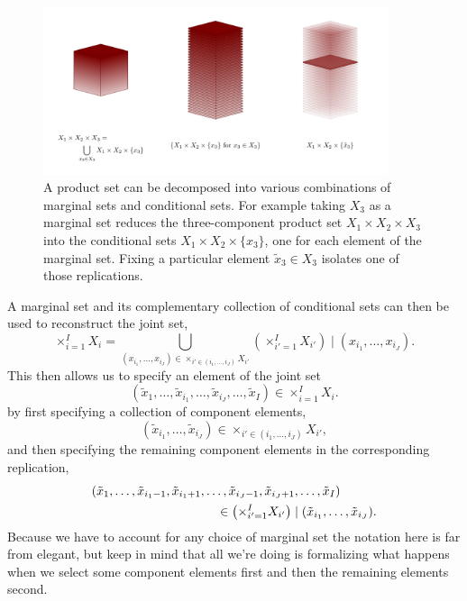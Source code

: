 \documentclass[
  letterpaper,
  DIV=11,
  numbers=noendperiod]{scrartcl}
\begin{document}
\begin{figure}

{\centering \includegraphics[width=0.9\textwidth,height=\textheight]{figures/conditioning/conditioning.pdf}

}

\caption{\label{fig-conditioning}A product set can be decomposed into
various combinations of marginal sets and conditional sets. For example
taking \(X_{3}\) as a marginal set reduces the three-component product
set \(X_{1} \times X_{2} \times X_{3}\) into the conditional sets
\(X_{1} \times X_{2} \times \{ x_{3} \}\), one for each element of the
marginal set. Fixing a particular element \(\tilde{x}_{3} \in X_{3}\)
isolates one of those replications.}

\end{figure}

A marginal set and its complementary collection of conditional sets can
then be used to reconstruct the joint set, \[
\times_{i = 1}^{I} X_{i}
=
\bigcup_{ (x_{i_{1}}, \ldots, x_{i_{J}}) \in \times_{ i' \in ( i_{1}, \ldots, i_{J} ) } X_{i'} }
\left( \times_{i' = 1}^{I} X_{i'} \right) \mid (x_{i_{1}}, \ldots, x_{i_{J}}).
\] This then allows us to specify an element of the joint set \[
(\tilde{x}_{1}, \ldots, \tilde{x}_{i_{1}}, \ldots, \tilde{x}_{i_{J}}, \ldots, \tilde{x}_{I})
\in \times_{i = 1}^{I} X_{i}.
\] by first specifying a collection of component elements, \[
(\tilde{x}_{i_{1}}, \ldots, \tilde{x}_{i_{J}})
\in \times_{ i' \in ( i_{1}, \ldots, i_{J} ) } X_{i'},
\] and then specifying the remaining component elements in the
corresponding replication, \begin{align*}
&(\tilde{x}_{1}, \ldots,
\tilde{x}_{i_{1} - 1}, \tilde{x}_{i_{1} + 1}, \ldots,
\tilde{x}_{i_{J} - 1}, \tilde{x}_{i_{J} + 1}, \ldots,
\tilde{x}_{I} )
\\
&\hspace{35mm} \in
\left( \times_{i' = 1}^{I} X_{i'} \right) \mid (\tilde{x}_{i_{1}}, \ldots, \tilde{x}_{i_{J}}).
\end{align*} Because we have to account for any choice of marginal set
the notation here is far from elegant, but keep in mind that all we're
doing is formalizing what happens when we select some component elements
first and then the remaining elements second.
\end{document}
